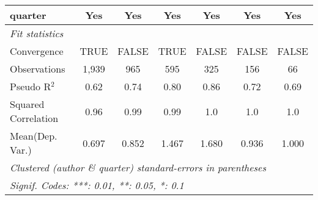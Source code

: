 \begin{tabular}{lcccccc}
   quarter                                                    & Yes           & Yes           & Yes         & Yes        & Yes          & Yes\\  
   \midrule
   \emph{Fit statistics}\\
   Convergence                                                &TRUE           & FALSE         & TRUE        & FALSE      & FALSE        & FALSE\\  
   Observations                                               & 1,939         & 965           & 595         & 325        & 156          & 66\\  
   Pseudo R$^2$                                               & 0.62          & 0.74          & 0.80        & 0.86       & 0.72         & 0.69\\  
   Squared Correlation                                        & 0.96          & 0.99          & 0.99        & 1.0        & 1.0          & 1.0\\  
Mean(Dep. Var.) & 0.697 & 0.852 & 1.467 & 1.680 & 0.936 & 1.000 \\
   \midrule \midrule
   \multicolumn{7}{l}{\emph{Clustered (author \& quarter) standard-errors in parentheses}}\\
   \multicolumn{7}{l}{\emph{Signif. Codes: ***: 0.01, **: 0.05, *: 0.1}}\\
\end{tabular}
\par\endgroup
